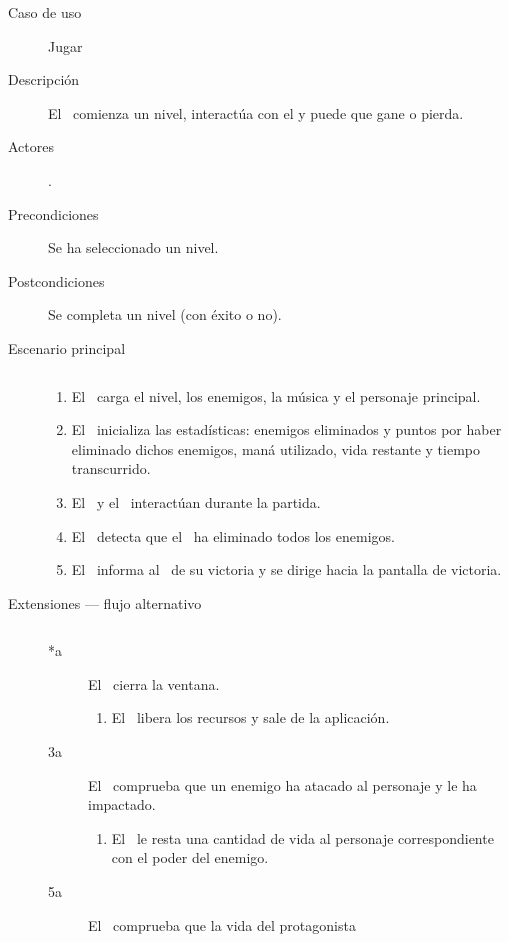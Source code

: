 \begin{description}
    \item [Caso de uso] Jugar
    \item [Descripción] El \jugador\ comienza un nivel, interactúa con el
    y puede que gane o pierda.
    \item [Actores] \jugador.
    \item [Precondiciones] Se ha seleccionado un nivel.
    \item [Postcondiciones] Se completa un nivel (con éxito o no).
    \item [Escenario principal] $\quad$
        \begin{enumerate}
            \item El \sistema\ carga el nivel, los enemigos, la música y el
            personaje principal.
            \item El \sistema\ inicializa las estadísticas: enemigos eliminados
            y puntos por haber eliminado dichos enemigos, maná utilizado,
            vida restante y tiempo transcurrido.
            \item El \jugador\ y el \sistema\ interactúan durante la partida.
            \item El \sistema\ detecta que el \jugador\ ha eliminado todos los enemigos.
            \item El \sistema\ informa al \jugador\ de su victoria y se dirige
            hacia la pantalla de victoria.
        \end{enumerate}
    \item[Extensiones --- flujo alternativo] $\quad$
        \begin{description}
            \item [*a] El \jugador\ cierra la ventana.
                \begin{enumerate}
                    \item El \sistema\ libera los recursos y sale de la aplicación.
                \end{enumerate}
            \item [3a] El \sistema\ comprueba que un enemigo ha atacado al personaje
            y le ha impactado.
                \begin{enumerate}
                    \item El \sistema\ le resta una cantidad de vida al personaje
                    correspondiente con el poder del enemigo.
                \end{enumerate}
            \item [5a] El \sistema\ comprueba que la vida del protagonista

\end{description}
\end{description}

